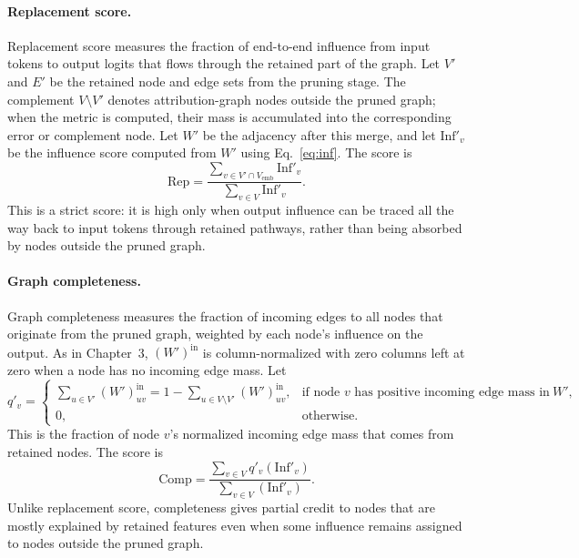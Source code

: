 \documentclass[../main.tex]{subfiles}
\begin{document}
\paragraph{Replacement score.}
Replacement score measures the fraction of end-to-end influence from input
tokens to output logits that flows through the retained part of the graph. Let
$V'$ and $E'$ be the retained node and edge sets from the pruning stage. The
complement $V \setminus V'$ denotes attribution-graph nodes outside the pruned
graph; when the metric is computed, their mass is accumulated into the
corresponding error or complement node. Let $W'$ be the adjacency after this
merge, and let $\mathrm{Inf}'_v$ be the influence score computed from $W'$ using
Eq.~\eqref{eq:inf}. The score is
\begin{equation}
\mathrm{Rep}
=
\frac{\sum_{v \in V' \cap V_{\text{emb}}} \mathrm{Inf}'_v}
     {\sum_{v \in V} \mathrm{Inf}'_v}.
\label{eq:metric-replacement}
\end{equation}
This is a strict score: it is high only when output influence can be traced all
the way back to input tokens through retained pathways, rather than
being absorbed by nodes outside the pruned graph.

\paragraph{Graph completeness.}
Graph completeness measures the fraction of incoming edges to all nodes that
originate from the pruned graph, weighted by each node's influence on the
output. As in Chapter~3, $(W')^{\text{in}}$ is column-normalized with zero
columns left at zero when a node has no incoming edge mass. Let
\[
q'_v =
\begin{cases}
\sum_{u \in V'} (W')^{\text{in}}_{uv}
= 1 - \sum_{u \in V \setminus V'} (W')^{\text{in}}_{uv},
& \text{if node } v \text{ has positive incoming edge mass in } W',\\
0, & \text{otherwise.}
\end{cases}
\]
This is the fraction of node $v$'s normalized incoming edge mass that comes from
retained nodes. The score is
\begin{equation}
\mathrm{Comp}
=
\frac{\sum_{v \in V} q'_v(\mathrm{Inf}'_v)}
     {\sum_{v \in V}(\mathrm{Inf}'_v)}.
\label{eq:metric-completeness}
\end{equation}
Unlike replacement score, completeness gives partial credit to nodes that are
mostly explained by retained features even when some influence remains assigned
to nodes outside the pruned graph.
\end{document}
